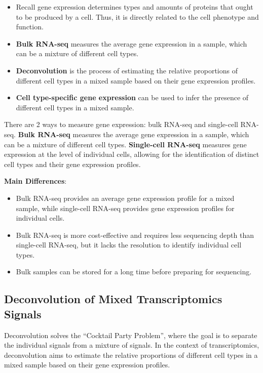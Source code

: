 \documentclass[a4paper]{article}
\begin{document}
\begin{itemize}
  \item Recall gene expression determines types and amounts of proteins that ought
  to be produced by a cell. Thus, it is directly related to the cell phenotype and
  function.
  \item \textbf{Bulk RNA-seq} measures the average gene expression in a sample, which can be a mixture of different cell types.  
  \item \textbf{Deconvolution} is the process of estimating the relative proportions of different cell types in a mixed sample based on their gene expression profiles.  
  \item \textbf{Cell type-specific gene expression} can be used to infer the presence of different cell types in a mixed sample.
\end{itemize}

There are 2 ways to measure gene expression: bulk RNA-seq and single-cell RNA-seq.
\textbf{Bulk RNA-seq} measures the average gene expression in a sample, which can be
a mixture of different cell types. \textbf{Single-cell RNA-seq} measures gene expression
at the level of individual cells, allowing for the identification of distinct cell types
and their gene expression profiles.

\textbf{Main Differences}:

\begin{itemize}
  \item Bulk RNA-seq provides an average gene expression profile for a mixed sample, 
  while single-cell RNA-seq provides gene expression profiles for individual cells.
  \item Bulk RNA-seq is more cost-effective and requires less sequencing depth than 
  single-cell RNA-seq, but it lacks the resolution to identify individual cell types.
  \item Bulk samples can be stored for a long time before preparing for sequencing.
\end{itemize}

\subsection*{Deconvolution of Mixed Transcriptomics Signals}

Deconvolution solves the ``Cocktail Party Problem'', where the goal is to separate
the individual signals from a mixture of signals. In the context of transcriptomics,
deconvolution aims to estimate the relative proportions of different cell types in
a mixed sample based on their gene expression profiles.
\end{document}
